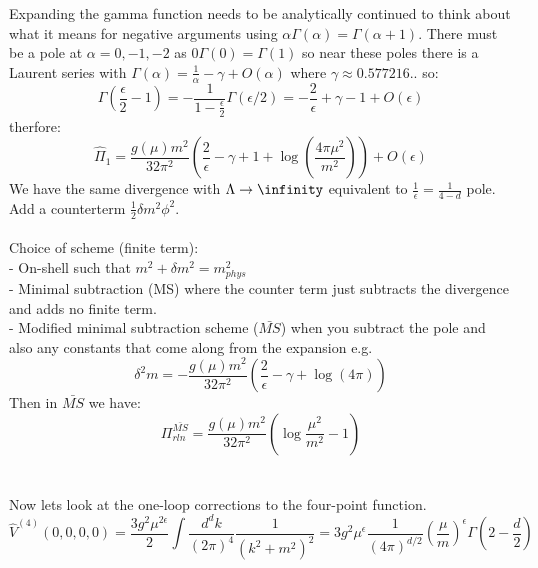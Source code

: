 \documentclass{article}
\begin{document}
        Expanding the gamma function needs to be analytically continued to think about what it means for negative arguments using $\alpha \Gamma( \alpha) = \Gamma( \alpha + 1)$. There must be a pole at $\alpha = 0, -1, -2$ as $0 \Gamma(0) =\Gamma(1)$ so near these poles there is a Laurent series with $\Gamma(\alpha) = \frac{1}{\alpha} - \gamma + O(\alpha)$ where $\gamma \approx 0.577216..$ so:
        $$
        \Gamma ( \frac{\epsilon}{2} - 1) = - \frac{1}{1- \frac{\epsilon}{2}} \Gamma( \epsilon/2) = - \frac{2}{\epsilon} + \gamma -1  + O(\epsilon)
        $$
        therfore:
        $$
        \hat \Pi_1 = \frac{g(\mu) m^2}{32 \pi^2} ( \frac{2}{\epsilon} - \gamma +1 + \log ( \frac{4 \pi \mu^2}{m^2}) ) + O(\epsilon)
        $$
        We have the same divergence with $\Lambda \rightarrow \infinity$ equivalent to $\frac{1}{\epsilon} = \frac{1}{4 - d}$ pole.
        Add a counterterm $\frac{1}{2} \delta m^2 \phi^2$.\\\\
        Choice of scheme (finite term):\\
        - On-shell such that $m^2 + \delta m^2 = m^2_{phys}$\\
        - Minimal subtraction (MS) where the counter term just subtracts the divergence and adds no finite term.\\
        - Modified minimal subtraction scheme ($\bar {MS}$) when you subtract the pole and also any constants that come along from the expansion e.g.
        $$
        \delta^2 m = - \frac{g(\mu) m^2}{32 \pi^2} ( \frac{2}{\epsilon} - \gamma + \log ( 4\pi))
        $$
        Then in $\bar{MS}$ we have:
        $$
        \Pi^{\bar{MS}}_{rln} = \frac{g(\mu) m^2}{32 \pi^2} ( \log \frac{\mu^2}{m^2} -1)
        $$
        \\\\
        Now lets look at the one-loop corrections to the four-point function.
        $$
        \hat V^{(4)} (0,0,0,0) = \frac{3 g^2 \mu^{2\epsilon}}{2} \int \frac{d^d k}{(2\pi)^4} \frac{1}{(k^2+m^2)^2} = 3 g^2 \mu^{\epsilon} \frac{1}{(4\pi)^{d/2}} ( \frac{\mu}{m})^{\epsilon} \Gamma( 2- \frac{d}{2}) 
        $$
\end{document}
